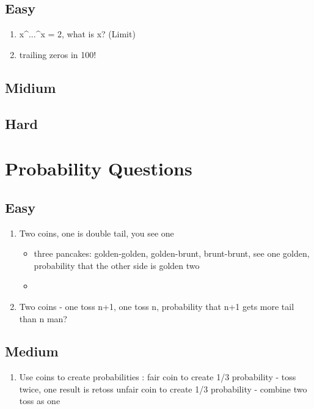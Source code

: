 \documentclass[11pt, openany]{book}              %
\begin{document}
\section{Easy}

\begin{enumerate}
	\item x^...^x = 2, what is x? (Limit)
	\item trailing zeros in 100!
\end{enumerate}


\section{Midium}
\section{Hard}


\chapter{Probability Questions}

\section{Easy}
\begin{enumerate}
 \item Two coins, one is double tail, you see one \\
  \begin{itemize}
    \item three pancakes: golden-golden, golden-brunt, brunt-brunt, see one golden, probability that the other side is golden two
    \item 
   \end{itemize}
 \item Two coins - one toss n+1, one toss n, probability that n+1 gets more tail than n man?
\end{enumerate}


\section{Medium}
\begin{enumerate}
	\item Use coins to create probabilities : fair coin to create 1/3 probability - toss twice, one result is retoss
unfair coin to create 1/3 probability - combine two toss as one


 \end{enumerate}
 
\end{document}
